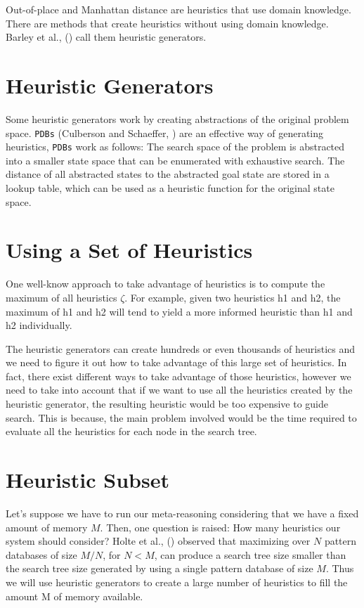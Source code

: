 Out-of-place and Manhattan distance are heuristics that use domain knowledge. There are methods that create heuristics without using domain knowledge. Barley et al., (\citeyear{BarleySantiagoOver}) call them heuristic generators.

\section{Heuristic Generators}
Some heuristic generators work by creating abstractions of the original problem space. \texttt{PDBs} (Culberson and Schaeffer, \citeyear{culberson1998pattern}) are an effective way of generating heuristics, \texttt{PDBs} work as follows: The search space of the problem is abstracted into a smaller state space that can be enumerated with exhaustive search. The distance of all abstracted states to the abstracted goal state are stored in a lookup table, which can be used as a heuristic function for the original state space.

\section{Using a Set of Heuristics}
One well-know approach to take advantage of heuristics is to compute the maximum of all heuristics $\zeta$. For example, given two heuristics h1 and h2, the maximum of h1 and h2 will tend to yield a more informed heuristic than h1 and h2 individually.

The heuristic generators can create hundreds or even thousands of heuristics and we need to figure it out how to take advantage of this large set of heuristics. In fact, there exist different ways to take advantage of those heuristics, however we need to take into account that if we want to use all the heuristics created by the heuristic generator, the resulting heuristic would be too expensive to guide search. This is because, the main problem involved would be the time required to evaluate all the heuristics for each node in the search tree.

\section{Heuristic Subset}
Let's suppose we have to run our meta-reasoning considering that we have a fixed amount of memory $M$. Then, one question is raised: How many heuristics our system should consider? Holte et al., (\citeyear{holte2006maximizing}) observed that maximizing over $N$ pattern databases of size $M/N$, for $N < M$, can produce a search tree size smaller than the search tree size generated by using a single pattern database of size $M$. Thus we will use heuristic generators to create a large number of heuristics to fill the amount M of memory available.

